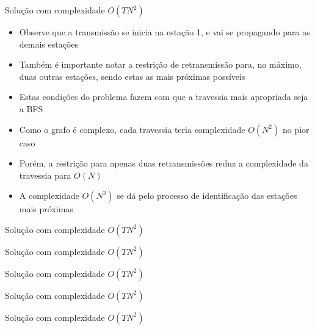 \begin{frame}[fragile]{Solução com complexidade $O(TN^2)$}

    \begin{itemize}
        \item Observe que a transmissão se inicia na estação 1, e vai se propagando para as
            demais estações

        \item Também é importante notar a restrição de retransmissão para, no máximo, duas outras
            estações, sendo estas as mais próximas possíveis

        \item Estas condições do problema fazem com que a travessia mais apropriada seja a BFS

        \item Como o grafo é complexo, cada travessia teria complexidade $O(N^2)$ no pior caso

        \item Porém, a restrição para apenas duas retransmissões reduz a complexidade da
            travessia para $O(N)$

        \item A complexidade $O(N^2)$ se dá pelo processo de identificação das estações mais
            próximas
   \end{itemize}

\end{frame}

\begin{frame}[fragile]{Solução com complexidade $O(TN^2)$}
\end{frame}

\begin{frame}[fragile]{Solução com complexidade $O(TN^2)$}
\end{frame}

\begin{frame}[fragile]{Solução com complexidade $O(TN^2)$}
\end{frame}

\begin{frame}[fragile]{Solução com complexidade $O(TN^2)$}
\end{frame}

\begin{frame}[fragile]{Solução com complexidade $O(TN^2)$}
\end{frame}
